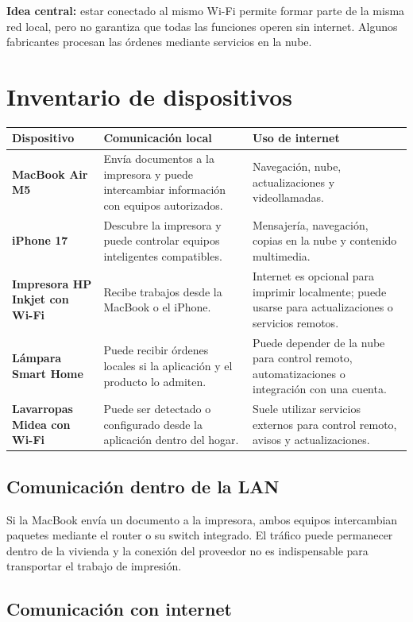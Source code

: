 \documentclass[11pt,a4paper]{article}
\newcommand{\infobox}[1]{%
  \noindent\colorbox{fondo}{\parbox{\dimexpr\textwidth-2\fboxsep}{#1}}}
\begin{document}
\infobox{\textcolor{azul}{\textbf{Idea central:}} estar conectado al mismo Wi-Fi permite formar parte de la misma red local, pero no garantiza que todas las funciones operen sin internet. Algunos fabricantes procesan las órdenes mediante servicios en la nube.}

\newpage
\section*{Inventario de dispositivos}

\begin{tabularx}{\textwidth}{>{\raggedright\arraybackslash\bfseries\color{azul}}p{3.3cm} >{\raggedright\arraybackslash}X >{\raggedright\arraybackslash}X}
  Dispositivo & Comunicación local & Uso de internet\\
  \hline
  MacBook Air M5 & Envía documentos a la impresora y puede intercambiar información con equipos autorizados. & Navegación, nube, actualizaciones y videollamadas.\\
  iPhone 17 & Descubre la impresora y puede controlar equipos inteligentes compatibles. & Mensajería, navegación, copias en la nube y contenido multimedia.\\
  Impresora HP Inkjet con Wi-Fi & Recibe trabajos desde la MacBook o el iPhone. & Internet es opcional para imprimir localmente; puede usarse para actualizaciones o servicios remotos.\\
  Lámpara Smart Home & Puede recibir órdenes locales si la aplicación y el producto lo admiten. & Puede depender de la nube para control remoto, automatizaciones o integración con una cuenta.\\
  Lavarropas Midea con Wi-Fi & Puede ser detectado o configurado desde la aplicación dentro del hogar. & Suele utilizar servicios externos para control remoto, avisos y actualizaciones.\\
\end{tabularx}

\subsection*{Comunicación dentro de la LAN}

Si la MacBook envía un documento a la impresora, ambos equipos intercambian paquetes mediante el router o su switch integrado. El tráfico puede permanecer dentro de la vivienda y la conexión del proveedor no es indispensable para transportar el trabajo de impresión.

\subsection*{Comunicación con internet}
\end{document}
